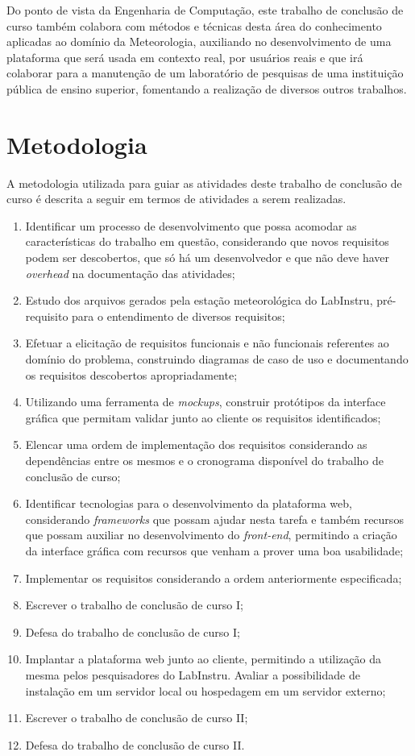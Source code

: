 Do ponto de vista da Engenharia de Computação, este trabalho de conclusão de curso também colabora com métodos e técnicas desta área do conhecimento aplicadas ao domínio da Meteorologia, auxiliando no desenvolvimento de uma plataforma que será usada em contexto real, por usuários reais e que irá colaborar para a manutenção de um laboratório de pesquisas de uma instituição pública de ensino superior, fomentando a realização de diversos outros trabalhos.

\section{Metodologia} \label{sec:metodologia}

A metodologia utilizada para guiar as atividades deste trabalho de conclusão de curso é descrita a seguir em termos de atividades a serem realizadas.

\begin{enumerate}[label=\textbf{Atividade \arabic*}.,leftmargin=*,labelindent=1em]
	\item Identificar um processo de desenvolvimento que possa acomodar as características do trabalho em questão, considerando que novos requisitos podem ser descobertos, que só há um desenvolvedor e que não deve haver \emph{overhead} na documentação das atividades;
	\item Estudo dos arquivos gerados pela estação meteorológica do LabInstru, pré-requisito para o entendimento de diversos requisitos;
	\item Efetuar a elicitação de requisitos funcionais e não funcionais referentes ao domínio do problema, construindo diagramas de caso de uso e documentando os requisitos descobertos apropriadamente;
	\item Utilizando uma ferramenta de \emph{mockups}, construir protótipos da interface gráfica que permitam validar junto ao cliente os requisitos identificados;
	\item Elencar uma ordem de implementação dos requisitos considerando as dependências entre os mesmos e o cronograma disponível do trabalho de conclusão de curso;
	\item Identificar tecnologias para o desenvolvimento da plataforma web, considerando \emph{frameworks} que possam ajudar nesta tarefa e também recursos que possam auxiliar no desenvolvimento do \emph{front-end}, permitindo a criação da interface gráfica com recursos que venham a prover uma boa usabilidade;
	\item Implementar os requisitos considerando a ordem anteriormente especificada;
	\item Escrever o trabalho de conclusão de curso I;
	\item Defesa do trabalho de conclusão de curso I;
	\item Implantar a plataforma web junto ao cliente, permitindo a utilização da mesma pelos pesquisadores do LabInstru. Avaliar a possibilidade de instalação em um servidor local ou hospedagem em um servidor externo;
	\item Escrever o trabalho de conclusão de curso II;
	\item Defesa do trabalho de conclusão de curso II.
\end{enumerate}


